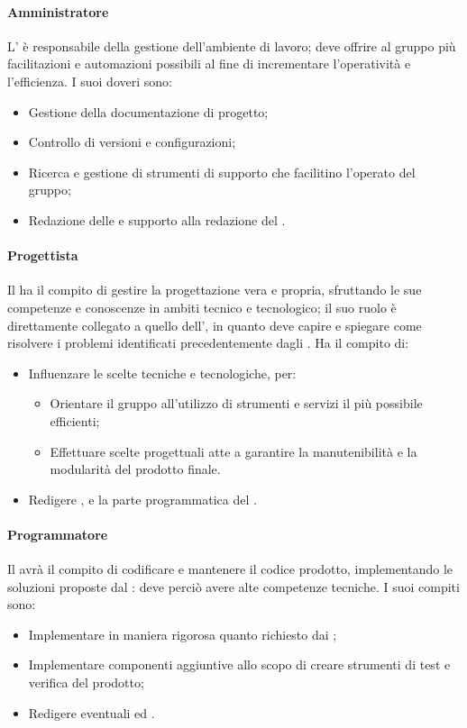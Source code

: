 \paragraph{Amministratore}
L'\adm{} è responsabile della gestione dell'ambiente di lavoro; deve offrire al gruppo più facilitazioni e automazioni possibili al fine di incrementare l'operatività e l'efficienza. I suoi doveri sono:
\begin{itemize}
\item Gestione della documentazione di progetto;
\item Controllo di versioni e configurazioni;
\item Ricerca e gestione di strumenti di supporto che facilitino l'operato del gruppo;
\item Redazione delle \NdP{} e supporto alla redazione del \PdP{}.
\end{itemize}

\paragraph{Progettista}
Il \prog{} ha il compito di gestire la progettazione vera e propria, sfruttando le sue competenze e conoscenze in ambiti tecnico e tecnologico; il suo ruolo è direttamente collegato a quello dell'\ana, in quanto deve capire e spiegare come risolvere i problemi identificati precedentemente dagli \anas. Ha il compito di:
\begin{itemize}
\item Influenzare le scelte tecniche e tecnologiche, per:
\begin{itemize}
\item Orientare il gruppo all'utilizzo di strumenti e servizi il più possibile efficienti;
\item Effettuare scelte progettuali atte a garantire la manutenibilità e la modularità del prodotto finale.
\end{itemize} 
\item Redigere \ST{}, \DdP{} e la parte programmatica del \PdQ{}.
\end{itemize}

\paragraph{Programmatore}
Il \progr{} avrà il compito di codificare e mantenere il codice prodotto, implementando le soluzioni proposte dal \prog{}: deve perciò avere alte competenze tecniche. I suoi compiti sono:
\begin{itemize}
\item Implementare in maniera rigorosa quanto richiesto dai \progs{};
\item Implementare componenti aggiuntive allo scopo di creare strumenti di test e verifica del prodotto;
\item Redigere eventuali \MU{} ed \MM{}.
\end{itemize}

